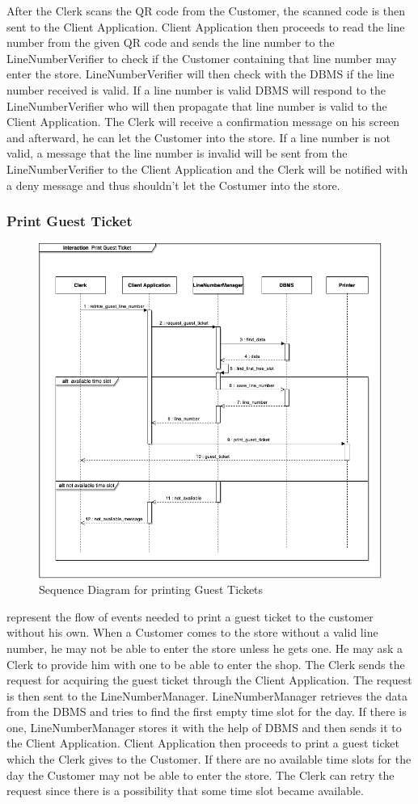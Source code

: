 After the Clerk scans the QR code from the Customer, the scanned code is then sent to the Client Application.
Client Application then proceeds to read the line number from the given QR code and sends the line number to the LineNumberVerifier to check if the Customer containing that line number may enter the store.
LineNumberVerifier will then check with the DBMS if the line number received is valid. If a line number is valid DBMS will respond to the LineNumberVerifier who will then propagate that line number is valid to the Client Application.
The Clerk will receive a confirmation message on his screen and afterward, he can let the Customer into the store.
If a line number is not valid, a message that the line number is invalid will be sent from the LineNumberVerifier to the Client Application and the Clerk will be notified with a deny message and thus shouldn't let the Costumer into the store.

\subsubsection{Print Guest Ticket}
\begin{figure}[H]
    \centering
    \includegraphics[height=0.4\textwidth]{Images/SequenceDiagrams/PrintGuestTicket.png}
    \caption{Sequence Diagram for printing Guest Tickets}
    \label{fig:SDPrintGuestTicket}
\end{figure}
 represent the flow of events needed to print a guest ticket to the customer without his own.
When a Customer comes to the store without a valid line number, he may not be able to enter the store unless he gets one.
He may ask a Clerk to provide him with one to be able to enter the shop. The Clerk sends the request for acquiring the guest ticket through the Client Application.
The request is then sent to the LineNumberManager. LineNumberManager retrieves the data from the DBMS and tries to find the first empty time slot for the day.
If there is one, LineNumberManager stores it with the help of DBMS and then sends it to the Client Application. Client Application then proceeds to print a guest ticket which the Clerk gives to the Customer.
If there are no available time slots for the day the Customer may not be able to enter the store. The Clerk can retry the request since there is a possibility that some time slot became available.


